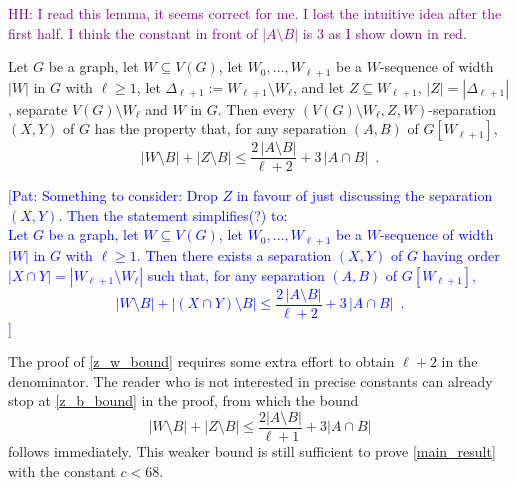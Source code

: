 \documentclass{patmorin}
\newcommand{\pat}[1]{\textcolor{Blue}{[Pat: #1]}}
\newcommand{\hussein}[1]{\textcolor{purple}{HH: #1}}
\begin{document}

\hussein{I read this lemma, it seems correct for me. I lost the intuitive idea after the first half. I think the constant in front of $|A\setminus B|$ is $3$ as I show down in red.}
\begin{lem}\label{z_w_bound}
  Let $G$ be a graph, let $W\subseteq V(G)$, let $W_0,\ldots,W_{\ell+1}$ be a $W$-sequence of width $|W|$ in $G$ with $\ell\ge 1$, let $\Delta_{\ell+1}:=W_{\ell+1}\setminus W_{\ell}$,  and let $Z\subseteq W_{\ell+1}$, $|Z|=|\Delta_{\ell+1}|$, separate $V(G)\setminus W_{\ell}$ and $W$ in $G$.
  Then every $(V(G)\setminus W_{\ell},Z,W)$-separation $(X,Y)$ of $G$ has the property that, for any separation
  $(A,B)$ of $G[W_{\ell+1}]$,
  \[
    |W\setminus B|+|Z\setminus B|\le \frac{2\,|A\setminus B|}{\ell+2}+3\,|A\cap B| \enspace .
  \]
\end{lem}

\pat{Something to consider: Drop $Z$ in favour of just discussing the separation $(X,Y)$.  Then the statement simplifies(?) to: \\[2ex]
  Let $G$ be a graph, let $W\subseteq V(G)$, let $W_0,\ldots,W_{\ell+1}$ be a $W$-sequence of width $|W|$ in $G$ with $\ell\ge 1$.  Then there exists a separation $(X,Y)$ of $G$ having order $|X\cap Y|=|W_{\ell+1}\setminus W_{\ell}|$ such that, for any separation $(A,B)$ of $G[W_{\ell+1}]$,
  \[
    |W\setminus B|+|(X\cap Y)\setminus B|\le \frac{2\,|A\setminus B|}{\ell+2}+3\,|A\cap B| \enspace .
  \]
}

\begin{rem}\label{easier_path}
  The proof of \cref{z_w_bound} requires some extra effort to obtain $\ell+2$ in the denominator. The reader who is not interested in precise constants can already stop at \cref{z_b_bound} in the proof, from which the bound
  \[
    |W\setminus B|+|Z\setminus B|\le \frac{2|A\setminus B|}{\ell+1} + 3|A\cap B|
  \]
  follows immediately.
  This weaker bound is still sufficient to prove \cref{main_result} with the constant $c< 68$.
\end{rem}
\end{document}
